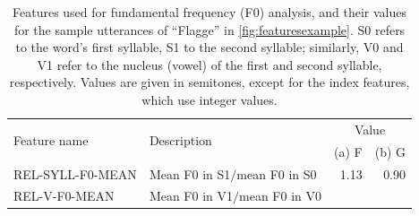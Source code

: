 %		
		
		\begin{table}%
		
		\caption[Features used for fundamental frequency (F0) analysis%
		]{%
		Features used for fundamental frequency (F0) analysis, and their values for the sample utterances of ``Flagge'' in \cref{fig:featuresexample}. 
		S0 refers to the word's first syllable, S1 to the second syllable; similarly, V0 and V1 refer to the nucleus (vowel) of the first and second syllable, respectively.
		Values are given in semitones, except for the index features, which use integer values.
		}
		{\renewcommand{\arraystretch}{1.25}%
		\begin{tabularx}{\textwidth}%
			{lXrr}
		\toprule
		\multirow{2}{*}{Feature name} 
									& \multirow{2}{*}{Description}
													& \multicolumn{2}{c}{Value} \\						
					  				&							&  (a) F		& (b) G
					  																																\\
		\midrule
		REL-SYLL-F0-MEAN 
			& Mean F0 in S1$/$mean F0 in S0
			& 1.13    & 0.90 \\
		REL-V-F0-MEAN 
			& Mean F0 in V1$/$mean F0 in V0

\end{tabularx}}
\end{table}
